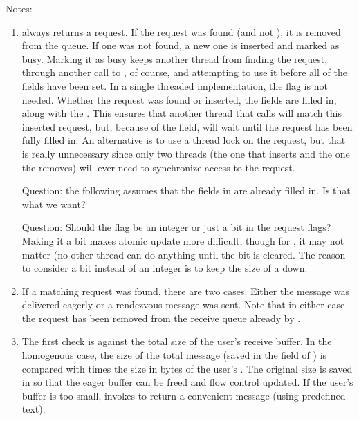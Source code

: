 
\ifcodefirst
{}
\fi

Notes:
\begin{enumerate}
\item {} always returns a request.  If the
  request was found (and not ), it is removed from the queue.  If
  one was not found, a new one is inserted and marked as busy.
  Marking it as busy 
  keeps another thread from finding the request, through another call to
  , of course, and attempting to use it before
  all of the fields have been set.  In a single threaded implementation, the
   flag is not needed.  
  Whether the request was found or inserted, 
  the  fields are filled in, along with the .
  This ensures that another thread that calls 
  will match this inserted request, but, because of the
   field,
  will wait until the request has been fully filled in.  An alternative is to
  use a thread lock on the request, but that is really unnecessary since only
  two threads (the one that inserts and the one the removes) will ever need to
  synchronize access to the request.

  Question: the following assumes that the fields in
   are already filled in.  Is that what we want?

  Question: Should the  flag be an integer or just a bit in the
  request flags?  Making it a bit makes atomic update more difficult, though
  for , it may not matter (no other thread can do anything until
  the  bit is cleared.  The reason to consider a bit instead of an
  integer is to keep the size of a  down.  

\item If a matching request was found, there are two cases.  Either the
  message was delivered eagerly or a rendezvous message was sent. Note that
  in either case the request has been removed from the receive queue already 
  by .

\item The first check is against the total size of the user's receive buffer.
  In the homogenous case, the size of the total message (saved in the
   field of ) is
  compared with  times the size in bytes of the user's
  .  The original size is saved in  so that the
  eager buffer can be freed and flow control updated.
  If the user's buffer is too small, invokes 
  to return a convenient message (using predefined text).


\end{enumerate}
